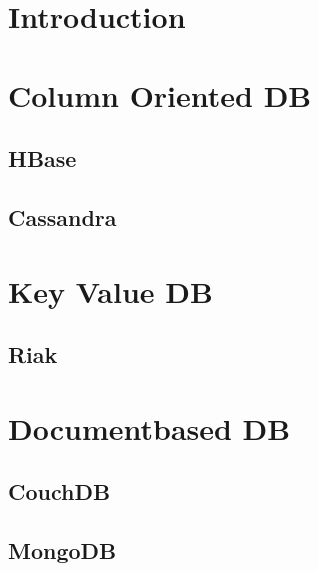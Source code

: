 \part{Introduction}


\part{Column Oriented DB}
\chapter{HBase}


\chapter{Cassandra}


\part{Key Value DB}










\chapter{Riak}





\part{Documentbased DB}
 
\chapter{CouchDB}


\newpage

\newpage



\chapter{MongoDB}







